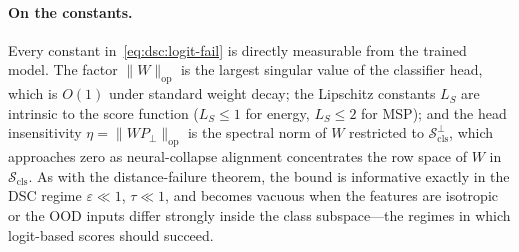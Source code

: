 \paragraph{On the constants.}
Every constant in~\eqref{eq:dsc:logit-fail} is directly measurable from the
trained model. The factor $\|W\|_{\mathrm{op}}$ is the largest singular value of
the classifier head, which is $O(1)$ under standard weight decay; the Lipschitz
constants $L_S$ are intrinsic to the score function ($L_S \le 1$ for energy,
$L_S \le 2$ for MSP); and the head insensitivity
$\eta = \|W P_\perp\|_{\mathrm{op}}$ is the spectral norm of $W$ restricted to
$\mathcal{S}_{\mathrm{cls}}^\perp$, which approaches zero as neural-collapse
alignment concentrates the row space of $W$ in $\mathcal{S}_{\mathrm{cls}}$. As
with the distance-failure theorem, the bound is informative exactly in the DSC
regime $\varepsilon \ll 1$, $\tau \ll 1$, and becomes vacuous when the features
are isotropic or the OOD inputs differ strongly inside the class subspace---the
regimes in which logit-based scores should succeed.
